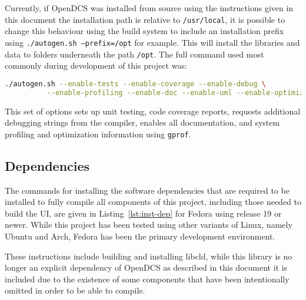       Currently, if OpenDCS was installed from source using the instructions
      given in this document the installation path is relative to
      \texttt{/usr/local}, it is possible to change this behaviour using the
      build system to include an installation prefix using
      \texttt{./autogen.sh --prefix=/opt} for example. This will install
      the libraries and data to folders underneath the path \texttt{/opt}.
      The full command used most commonly during development of this project
      was:

      \begin{lstlisting}[language=bash,nolol]
      ./autogen.sh --enable-tests --enable-coverage --enable-debug \
          --enable-profiling --enable-doc --enable-uml --enable-optimizations
      \end{lstlisting}

      This set of options sets up unit testing, code coverage reports,
      requests additional debugging strings from the compiler, enables all
      documentation, and system profiling and optimization information using
      \texttt{gprof}.

  \subsection{Dependencies}\label{sec:inst-dep}

    The commands for installing the software dependencies that are required to
    be installed to fully compile all components of this project, including
    those needed to build the UI, are given in Listing~\ref{lst:inst-dep} for
    Fedora using release 19 or newer.  While this project has been tested using
    other variants of Linux, namely Ubuntu and Arch, Fedora has been the
    primary development environment.

    These instructions include building and installing libcld, while this
    library is no longer an explicit dependency of OpenDCS as described in this
    document it is included due to the existence of some components that have
    been intentionally omitted in order to be able to compile.

